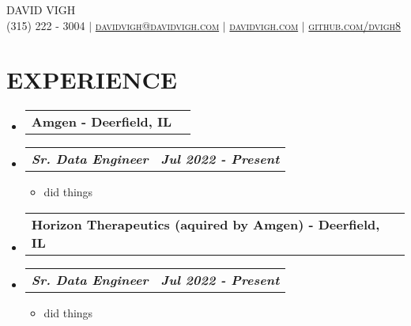 \documentclass[letterpaper,11pt]{article}
\makeatletter
\newcommand{\resumeItem}[1]{
  \item\small{
    {#1 \vspace{0pt}}
  }
}
\newcommand{\resumeSubheading}[2]{
  \vspace{-1pt}\item
    \begin{tabular*}{0.97\textwidth}[t]{l@{\extracolsep{\fill}}r}
      \textbf{\small#1 - \small#2} 
    \end{tabular*}\vspace{-13pt}
}
\newcommand{\resumeSubSubheading}[2]{
    \item
    \vspace{2pt}
    \begin{tabular*}{0.97\textwidth}{l@{\extracolsep{\fill}}r}
      \textbf{\textit{\small#1}} & \textbf{\textit{\small#2}} \\
    \end{tabular*}\vspace{-5pt}
}
\newcommand{\resumeHeadingListStart}{\begin{itemize}[leftmargin=0.05in, label={}]}
\newcommand{\resumeHeadingListEnd}{\end{itemize}}
\newcommand{\resumeSubHeadingListStart}{\begin{itemize}[leftmargin=0.15in, label={}]}
\newcommand{\resumeSubHeadingListEnd}{\end{itemize}\vspace{-10pt}}
\newcommand{\resumeItemListStart}{\begin{itemize}[leftmargin=0.15in]}
\newcommand{\resumeItemListEnd}{\end{itemize}\vspace{-10pt}}
\makeatother
\begin{document}
\thispagestyle{fancy}
\fancyhf{} %
\fancyheadoffset[R]{-0.1cm}

\begin{center}
    \Huge \scshape DAVID VIGH \\ \vspace{1pt}
    \small (315) 222 - 3004 $|$ 
    \href{mailto:davidvigh@davidvigh.com}{davidvigh@davidvigh.com} $|$ 
    \href{https://www.davidvigh.com/}{davidvigh.com} $|$
    \href{https://github.com/dvigh8}{github.com/dvigh8} \\ \vspace{-5pt}
\end{center}


\section{\textbf{EXPERIENCE}}

    \resumeHeadingListStart
        \resumeSubheading{Amgen}{Deerfield, IL}
    \resumeHeadingListEnd
        \resumeSubHeadingListStart
            \resumeSubSubheading {Sr. Data Engineer}{Jul 2022 - Present}
            \resumeItemListStart
                \resumeItem{ did things}
            \resumeItemListEnd
        \resumeSubHeadingListEnd
    \resumeHeadingListStart
        \resumeSubheading{Horizon Therapeutics (aquired by Amgen)}{Deerfield, IL}
    \resumeHeadingListEnd
        \resumeSubHeadingListStart
            \resumeSubSubheading {Sr. Data Engineer}{Jul 2022 - Present}
            \resumeItemListStart
                \resumeItem{ did things}
            \resumeItemListEnd
        \resumeSubHeadingListEnd
\end{document}
